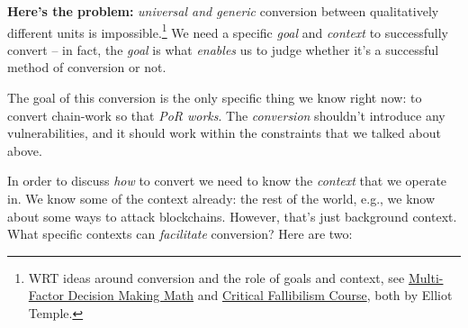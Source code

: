 
\textbf{Here's the problem:} \emph{universal and generic} conversion between qualitatively different units is impossible.\footnote{WRT ideas around conversion and the role of goals and context, see \href{https://criticalfallibilism.com/multi-factor-decision-making-math}{Multi-Factor Decision Making Math} and \href{https://curi.gumroad.com/l/mhtbA}{Critical Fallibilism Course}, both by Elliot Temple.}
We need a specific \emph{goal} and \emph{context} to successfully convert -- in fact, the \emph{goal} is what \emph{enables} us to judge whether it's a successful method of conversion or not.

The goal of this conversion is the only specific thing we know right now: to convert chain-work so that \emph{PoR works}.
The \emph{conversion} shouldn't introduce any vulnerabilities, and it should work within the constraints that we talked about above.

In order to discuss \emph{how} to convert we need to know the \emph{context} that we operate in.
We know some of the context already: the rest of the world, e.g., we know about some ways to attack blockchains.
However, that's just background context.
What specific contexts can \emph{facilitate} conversion?
Here are two:

